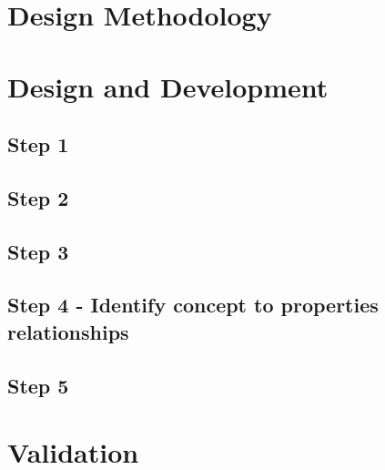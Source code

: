 \documentclass[12pt]{article}
\begin{document}
\newpage
\section{Design Methodology}

	
\newpage
\section{Design and Development}

\subsection{Step 1}


\subsection{Step 2}


\subsection{Step 3}


\subsection{Step 4 - Identify concept to properties relationships}


\subsection{Step 5}


\newpage
\section{Validation}

\end{document}
